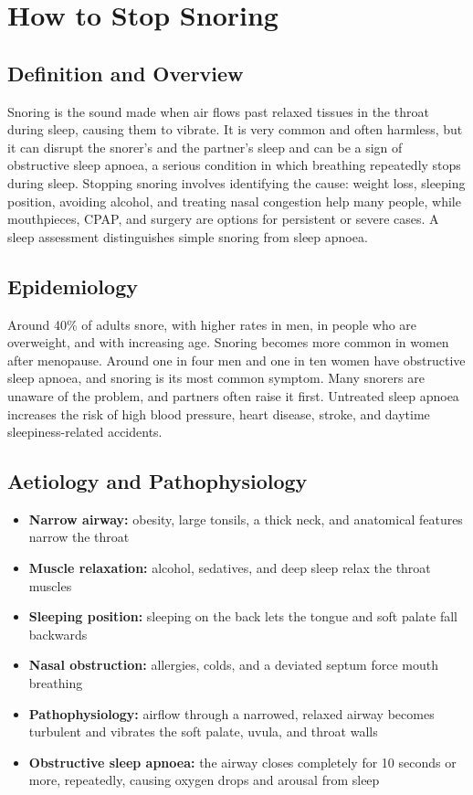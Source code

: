 \chapter{How to Stop Snoring}

\section*{Definition and Overview}
Snoring is the sound made when air flows past relaxed tissues in the throat during sleep, causing them to vibrate. It is very common and often harmless, but it can disrupt the snorer's and the partner's sleep and can be a sign of obstructive sleep apnoea, a serious condition in which breathing repeatedly stops during sleep. Stopping snoring involves identifying the cause: weight loss, sleeping position, avoiding alcohol, and treating nasal congestion help many people, while mouthpieces, CPAP, and surgery are options for persistent or severe cases. A sleep assessment distinguishes simple snoring from sleep apnoea.

\section*{Epidemiology}
Around 40\% of adults snore, with higher rates in men, in people who are overweight, and with increasing age. Snoring becomes more common in women after menopause. Around one in four men and one in ten women have obstructive sleep apnoea, and snoring is its most common symptom. Many snorers are unaware of the problem, and partners often raise it first. Untreated sleep apnoea increases the risk of high blood pressure, heart disease, stroke, and daytime sleepiness-related accidents.

\section*{Aetiology and Pathophysiology}
\begin{itemize}
    \item \textbf{Narrow airway:} obesity, large tonsils, a thick neck, and anatomical features narrow the throat
    \item \textbf{Muscle relaxation:} alcohol, sedatives, and deep sleep relax the throat muscles
    \item \textbf{Sleeping position:} sleeping on the back lets the tongue and soft palate fall backwards
    \item \textbf{Nasal obstruction:} allergies, colds, and a deviated septum force mouth breathing
    \item \textbf{Pathophysiology:} airflow through a narrowed, relaxed airway becomes turbulent and vibrates the soft palate, uvula, and throat walls
    \item \textbf{Obstructive sleep apnoea:} the airway closes completely for 10 seconds or more, repeatedly, causing oxygen drops and arousal from sleep
\end{itemize}

